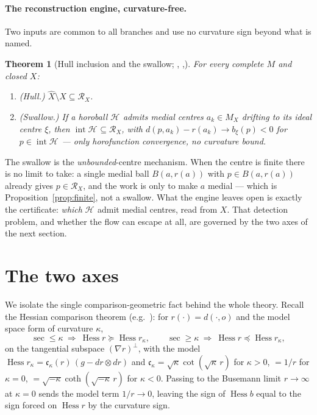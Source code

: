 \documentclass[11pt]{article}
\newtheorem{theorem}{Theorem}[section]
\theoremstyle{remark}
\newcommand{\X}{X}
\newcommand{\Xhat}{\widehat{\X}}
\newcommand{\Mx}{M_{\X}}
\newcommand{\Rx}{\mathcal{R}_{\X}}
\newcommand{\Hb}[1]{\mathcal{H}_{#1}}
\newcommand{\sect}{\operatorname{sec}}
\newcommand{\Hess}{\operatorname{Hess}}
\begin{document}
\paragraph{The reconstruction engine, curvature-free.} Two inputs are
common to all branches and use no curvature sign beyond what is named.

\begin{theorem}[Hull inclusion and the swallow; {\cite[Thm.~3.1]{R1},
\cite[Lem.~2.2]{R3},\cite[Lem.~3.1]{Sph}}]\label{thm:engine}
For every complete $M$ and closed $\X$:
\begin{enumerate}[label=\textup{(\arabic*)}]
\item \emph{(Hull.)} $\Xhat\setminus\X\subseteq\Rx$.
\item \emph{(Swallow.)} If a horoball $\Hb{}$ admits medial centres
$a_{k}\in\Mx$ drifting to its ideal centre $\xi$, then
$\operatorname{int}\Hb{}\subseteq\Rx$, with
$d(p,a_{k})-r(a_{k})\to b_{\xi}(p)<0$ for $p\in\operatorname{int}\Hb{}$
--- only horofunction convergence, \emph{no curvature bound}.
\end{enumerate}
\end{theorem}

The swallow is the \emph{unbounded}-centre mechanism. When the centre is
finite there is no limit to take: a single medial ball $B(a,r(a))$ with
$p\in B(a,r(a))$ already gives $p\in\Rx$, and the work is only to make $a$
medial --- which is Proposition~\ref{prop:finite}, not a swallow. What the
engine leaves open is exactly the certificate: \emph{which} $\Hb{}$ admit
medial centres, read from $\X$. That detection problem, and whether the
flow can escape at all, are governed by the two axes of the next section.

\section{The two axes}\label{sec:trich}

We isolate the single comparison-geometric fact behind the whole theory.
Recall the Hessian comparison theorem (e.g.\ \cite[Ch.~6]{doCarmo}): for
$r(\cdot)=d(\cdot,o)$ and the model space form of curvature $\kappa$,
\[
  \sect\le\kappa\ \Longrightarrow\ \Hess r\succeq\Hess r_{\kappa},
  \qquad
  \sect\ge\kappa\ \Longrightarrow\ \Hess r\preceq\Hess r_{\kappa},
\]
on the tangential subspace $(\nabla r)^{\perp}$, with the model
$\Hess r_{\kappa}=\mathfrak{c}_{\kappa}(r)\,(g-dr\otimes dr)$ and
$\mathfrak{c}_{\kappa}=\sqrt{\kappa}\cot(\sqrt{\kappa}\,r)$ for
$\kappa>0$, $=1/r$ for $\kappa=0$, $=\sqrt{-\kappa}\coth(\sqrt{-\kappa}\,r)$
for $\kappa<0$. Passing to the Busemann limit $r\to\infty$ at $\kappa=0$
sends the model term $1/r\to0$, leaving the sign of $\Hess b$ equal to the
sign forced on $\Hess r$ by the curvature sign.
\end{document}
